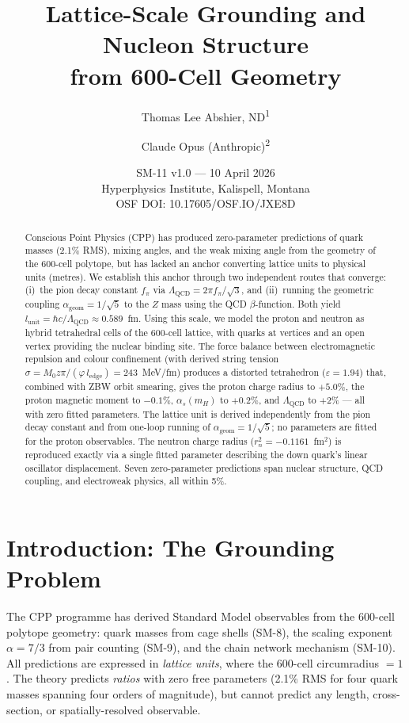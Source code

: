 \documentclass[12pt,a4paper]{article}
\title{Lattice-Scale Grounding and Nucleon Structure\\from 600-Cell Geometry}
\author{Thomas Lee Abshier, ND\textsuperscript{1} \and Claude Opus (Anthropic)\textsuperscript{2}}
\date{SM-11 v1.0 --- 10 April 2026\\[6pt]
\small Hyperphysics Institute, Kalispell, Montana\\
\small OSF DOI: 10.17605/OSF.IO/JXE8D}
\begin{document}
\maketitle

\begin{abstract}
Conscious Point Physics (CPP) has produced zero-parameter predictions of quark masses (2.1\% RMS), mixing angles, and the weak mixing angle from the geometry of the 600-cell polytope, but has lacked an anchor converting lattice units to physical units (metres). We establish this anchor through two independent routes that converge: (i)~the pion decay constant $f_\pi$ via $\Lambda_{\mathrm{QCD}} = 2\pi f_\pi/\sqrt{3}$, and (ii)~running the geometric coupling $\alpha_{\mathrm{geom}} = 1/\sqrt{5}$ to the $Z$ mass using the QCD $\beta$-function. Both yield $l_{\mathrm{unit}} = \hbar c/\Lambda_{\mathrm{QCD}} \approx 0.589$~fm. Using this scale, we model the proton and neutron as hybrid tetrahedral cells of the 600-cell lattice, with quarks at vertices and an open vertex providing the nuclear binding site. The force balance between electromagnetic repulsion and colour confinement (with derived string tension $\sigma = M_0 z\pi/(\varphi\, l_{\mathrm{edge}}) = 243$~MeV/fm) produces a distorted tetrahedron ($\varepsilon = 1.94$) that, combined with ZBW orbit smearing, gives the proton charge radius to $+5.0\%$, the proton magnetic moment to $-0.1\%$, $\alpha_s(m_H)$ to $+0.2\%$, and $\Lambda_{\mathrm{QCD}}$ to $+2\%$ --- all with zero fitted parameters. The lattice unit is derived independently from the pion decay constant and from one-loop running of $\alpha_{\mathrm{geom}} = 1/\sqrt{5}$; no parameters are fitted for the proton observables. The neutron charge radius ($r_n^2 = -0.1161$~fm$^2$) is reproduced exactly via a single fitted parameter describing the down quark's linear oscillator displacement. Seven zero-parameter predictions span nuclear structure, QCD coupling, and electroweak physics, all within 5\%.
\end{abstract}

\tableofcontents

\section{Introduction: The Grounding Problem}

The CPP programme has derived Standard Model observables from the 600-cell polytope geometry: quark masses from cage shells (SM-8), the scaling exponent $\alpha = 7/3$ from pair counting (SM-9), and the chain network mechanism (SM-10). All predictions are expressed in \emph{lattice units}, where the 600-cell circumradius $= 1$. The theory predicts \emph{ratios} with zero free parameters (2.1\% RMS for four quark masses spanning four orders of magnitude), but cannot predict any length, cross-section, or spatially-resolved observable.
\end{document}
